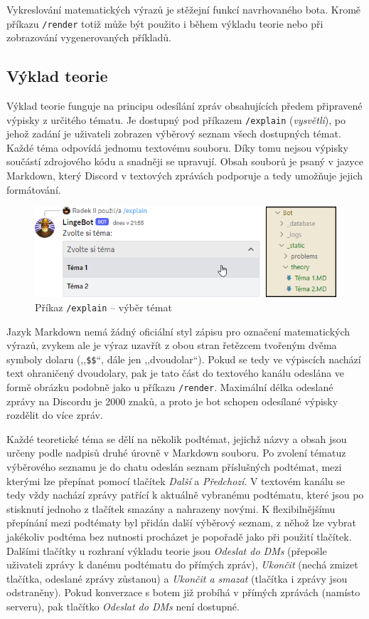 \documentclass[FM]{tulthesis}
\begin{document}
	Vykreslování matematických výrazů je stěžejní funkcí navrhovaného bota. Kromě příkazu \verb|/render| totiž může být použito i během výkladu teorie nebo při zobrazování vygenerovaných příkladů.
	
	\subsection{Výklad teorie}
	
	Výklad teorie funguje na principu odesílání zpráv obsahujících předem připravené výpisky z určitého tématu. Je dostupný pod příkazem \verb|/explain| (\textit{vysvětli}), po jehož zadání je uživateli zobrazen výběrový seznam všech dostupných témat. Každé téma odpovídá jednomu textovému souboru. Díky tomu nejsou výpisky součástí zdrojového kódu a snadněji se upravují. Obsah souborů je psaný v jazyce Markdown, který Discord v textových zprávách podporuje a tedy umožňuje jejich formátování.
	
	\begin{figure}[ht]
		\centering
		\includegraphics[width=\textwidth]{img/5X/Explain0}
		\caption{Příkaz \texttt{/explain} – výběr témat}
	\end{figure}
	
	Jazyk Markdown nemá žádný oficiální styl zápisu pro označení matematických výrazů, zvykem ale je výraz uzavřít z obou stran řetězcem tvořeným dvěma symboly dolaru (,,\verb|$$|``, dále jen ,,dvoudolar``). Pokud se tedy ve výpiscích nachází text ohraničený dvoudolary, pak je tato část do textového kanálu odeslána ve formě obrázku podobně jako u příkazu \verb|/render|. Maximální délka odeslané zprávy na Discordu je 2000 znaků, a proto je bot schopen odesílané výpisky rozdělit do více zpráv.
	
	Každé teoretické téma se dělí na několik podtémat, jejichž názvy a obsah jsou \mbox{určeny} podle nadpisů druhé úrovně v Markdown souboru. Po zvolení tématu\break z \mbox{výběrového} seznamu je do chatu odeslán seznam příslušných podtémat, mezi kterými lze přepínat pomocí tlačítek \textit{Další} a \textit{Předchozí}. V textovém kanálu se tedy vždy nachází zprávy patřící k aktuálně vybranému podtématu, které jsou po stisknutí jednoho z tlačítek smazány a nahrazeny novými. K flexibilnějšímu přepínání mezi podtématy byl přidán další výběrový seznam, z něhož lze vybrat jakékoliv podtéma bez nutnosti procházet je popořadě jako při použití tlačítek. Dalšími tlačítky u rozhraní výkladu teorie jsou \textit{Odeslat do DMs} (přepošle uživateli zprávy k danému podtématu do přímých zpráv), \textit{Ukončit} (nechá zmizet tlačítka, odeslané zprávy zůstanou) a \textit{Ukončit a smazat} (tlačítka i zprávy jsou odstraněny). Pokud konverzace s botem již probíhá v přímých zprávách (namísto serveru), pak tlačítko \textit{Odeslat do DMs} není dostupné.
	
\end{document}
